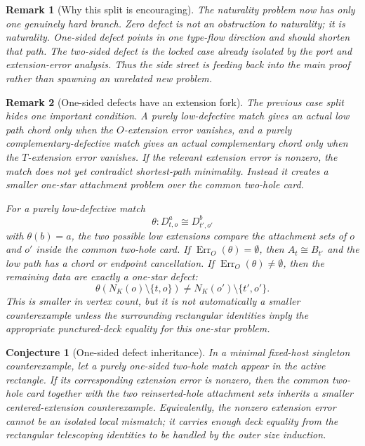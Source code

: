 \documentclass[11pt]{article}
\newtheorem{conjecture}{Conjecture}
\newtheorem{remark}{Remark}
\newcommand{\Err}{\operatorname{Err}}
\begin{document}
\begin{remark}[Why this split is encouraging]
The naturality problem now has only one genuinely hard branch.  Zero defect is
not an obstruction to naturality; it is naturality.  One-sided defect points in
one type-flow direction and should shorten that path.  The two-sided defect is
the locked case already isolated by the port and extension-error analysis.
Thus the side street is feeding back into the main proof rather than spawning
an unrelated new problem.
\end{remark}

\begin{remark}[One-sided defects have an extension fork]
The previous case split hides one important condition.  A purely low-defective
match gives an actual low path chord only when the \(O\)-extension error
vanishes, and a purely complementary-defective match gives an actual
complementary chord only when the \(T\)-extension error vanishes.  If the
relevant extension error is nonzero, the match does not yet contradict
shortest-path minimality.  Instead it creates a smaller one-star attachment
problem over the common two-hole card.

For a purely low-defective match
\[
  \theta:D_{t,o}^a\cong D_{t',o'}^b
\]
with \(\theta(b)=a\), the two possible low extensions compare the attachment
sets of \(o\) and \(o'\) inside the common two-hole card.  If
\(\Err_O(\theta)=\emptyset\), then \(A_t\cong B_{t'}\) and the low path has a
chord or endpoint cancellation.  If \(\Err_O(\theta)\neq\emptyset\), then the
remaining data are exactly a one-star defect:
\[
  \theta(N_K(o)\setminus\{t,o\})
  \neq
  N_K(o')\setminus\{t',o'\}.
\]
This is smaller in vertex count, but it is not automatically a smaller
counterexample unless the surrounding rectangular identities imply the
appropriate punctured-deck equality for this one-star problem.
\end{remark}

\begin{conjecture}[One-sided defect inheritance]
In a minimal fixed-host singleton counterexample, let a purely one-sided
two-hole match appear in the active rectangle.  If its corresponding extension
error is nonzero, then the common two-hole card together with the two
reinserted-hole attachment sets inherits a smaller centered-extension
counterexample.  Equivalently, the nonzero extension error cannot be an
isolated local mismatch; it carries enough deck equality from the rectangular
telescoping identities to be handled by the outer size induction.
\end{conjecture}
\end{document}

